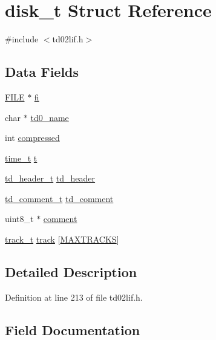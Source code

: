 \hypertarget{structdisk__t}{}\section{disk\+\_\+t Struct Reference}
\label{structdisk__t}


{\ttfamily \#include $<$td02lif.\+h$>$}

\subsection*{Data Fields}
\begin{DoxyCompactItemize}
\item 
\hyperlink{posix_8h_aed4dabeb9f7c518ded42f930a04abce8}{F\+I\+LE} $\ast$ \hyperlink{structdisk__t_a1832d0f8cdda8f731de9e1daea2900a5}{fi}
\item 
char $\ast$ \hyperlink{structdisk__t_a8be70c86aaffb22bab0e0969630a7062}{td0\+\_\+name}
\item 
int \hyperlink{structdisk__t_abe333f1a8b322fbed0d1c1178939016e}{compressed}
\item 
\hyperlink{time_8h_a3346b04b0420b32ccf6b706551b70762}{time\+\_\+t} \hyperlink{structdisk__t_a6cb7e0306f35b8b97bf3ef18e2f45455}{t}
\item 
\hyperlink{structtd__header__t}{td\+\_\+header\+\_\+t} \hyperlink{structdisk__t_a83cf946593922db2bdedef21bb7b4aff}{td\+\_\+header}
\item 
\hyperlink{structtd__comment__t}{td\+\_\+comment\+\_\+t} \hyperlink{structdisk__t_a7d84ffa6301a1e05b5a8a686d710bb8f}{td\+\_\+comment}
\item 
uint8\+\_\+t $\ast$ \hyperlink{structdisk__t_abd7a6652f29f0059638dab7a88558783}{comment}
\item 
\hyperlink{structtrack__t}{track\+\_\+t} \hyperlink{structdisk__t_a6498dff29cc11a772be6e0cabb54520f}{track} \mbox{[}\hyperlink{td02lif_8h_ade239296a2facdacc8b64d0791e2d806}{M\+A\+X\+T\+R\+A\+C\+KS}\mbox{]}
\end{DoxyCompactItemize}


\subsection{Detailed Description}


Definition at line 213 of file td02lif.\+h.



\subsection{Field Documentation}
\mbox{\label{structdisk__t_abd7a6652f29f0059638dab7a88558783}} 
